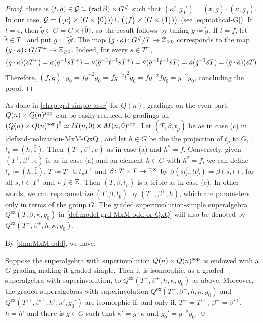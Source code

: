 \begin{proof}
    there is $(t, \tilde g) \in \mathcal G \subseteq (\operatorname{rad} \tilde \beta) \times G^\#$ such that $(\kappa', g_0') = (t, \tilde g) \cdot (\kappa, g_0)$. 
    In our case, $\mathcal G = \big( \{e\} \times (G \times \{ \bar 0 \}) \big) \cup \big( \{f\} \times (G \times \{ \bar 1 \}) \big)$ (see \cref{eq:mathcal-G}). 
    If $t = e$, then $\tilde g \in G = G\times \{ \bar 0 \}$, so the result follows by taking $g \coloneqq \tilde g$. 
    If $t = f$, let $\tilde t \in T^-$ and put $g \coloneqq \tilde g \tilde t$. 
    The map $(\tilde g \cdot \tilde \kappa)\colon G^\#/T \to \mathbb{Z}_{\geq 0}$ corresponds to the map $(g \cdot \kappa)\colon G/T^+ \to \mathbb{Z}_{\geq 0}$. 
    Indeed, for every $s\in T^+$,
    \[
    (g\cdot \kappa) (sT^+) =
    \kappa (g^{-1} sT^+) =
    \kappa (\tilde g^{-1} \tilde t^{-1} sT^+) = 
    \tilde\kappa (\tilde g^{-1} \tilde t^{-1} sT) = 
    \tilde\kappa (\tilde g^{-1} \tilde sT)  =
    (\tilde g \cdot \tilde\kappa)(sT).
    \]
    Therefore, $(f, \tilde g) \cdot g_0 = f \tilde g ^{-2} g_0 = f g ^{-2} \tilde t ^{2} g_0 = fg ^{-2} f g_0 =  g ^{-2} g_0$, concluding the proof. 
\end{proof}

As done in \cref{chap:grd-simple-assc} for $Q(n)$, gradings on the even part, $Q(n)\times Q(n)^{\mathrm{sop}}$ can be easily reduced to gradings on $(Q(n)\times Q(n)^{\mathrm{sop}})^{\bar0} \simeq M(n, 0) \times M(n, 0) ^{\mathrm{sop}}$. 
Let $(T, \tilde\beta, t_p)$ be as in case (c) in \cref{def:std-realization-MxM-QxQ}, and let $h\in G$ be the the projection of $t_p$ to $G$, \ie, $t_p = (h, \bar 1)$. 
Then $(T^+, \beta^+, e)$ as in case (a) and $h^2 = f$. 
Conversely, given $(T^+, \beta^+, e)$ is as in case (a) and an element $h\in G$ with $h^2 = f$, we can define $t_p \coloneqq (h, \bar 1)$, $T \coloneqq T^+ \cup t_p T^+$ and $\beta\colon T\times T \to \mathbb{F}^\times$ by $\beta(s t_p^i, t t_p^j) = \beta(s,t)$, for all $s, t \in T^+$ and $i, j \in \mathbb{Z}$. 
Then $(T, \beta, t_p)$ is a triple as in case (c). 
In other words, we can reparametrize $(T, \beta, t_p)$ by $(T^+, \beta^+, h)$, which are parameters only in terms of the group $G$. 
The graded superinvolution-simple superalgebra $Q^{\mathrm{ex}} (T, \beta, \kappa, g_0)$ in \cref{def:model-grd-MxM-odd-or-QxQ} will also be denoted by $Q^{\mathrm{ex}} (T^+, \beta^+,  h, \kappa, g_0)$. 

By \cref{thm:MxM-odd}, we have:

\begin{cor}\label{cor:QxQ-reduced-to-MxM}
    Suppose the superalgebra with superinvolution $Q(n) \times Q(n)^{\mathrm{sop}}$ is endowed with a $G$-grading making it graded-simple. 
    Then it is isomorphic, as a graded superalgebra with superinvolution, to $Q^{\mathrm{ex}}(T^+,\beta^+, h, \kappa, g_0)$ as above. 
    Moreover, the graded superalgebras with superinvolution $Q^{\mathrm{ex}} (T^+, \beta^+,  h, \kappa, g_0)$ and $Q^{\mathrm{ex}} (T'^+, \beta'^+,  h', \kappa', g_0')$ are isomorphic if, and only if, $T^+ =T'^+$, $\beta^+ = \beta'^+$, $h = h'$ and there is $g \in G$ such that $\kappa' = g\cdot\kappa$ and $g_0' = g^{-2}g_0$. \qed
\end{cor}

